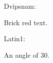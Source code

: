 \documentclass{article}
\begin{document}
Dvipsnam: \owndvipsnam

\textcolor{BrickRed}{Brick red text.}

Latin1: \ownlatin

An angle of 30\textdegree.
\end{document}
